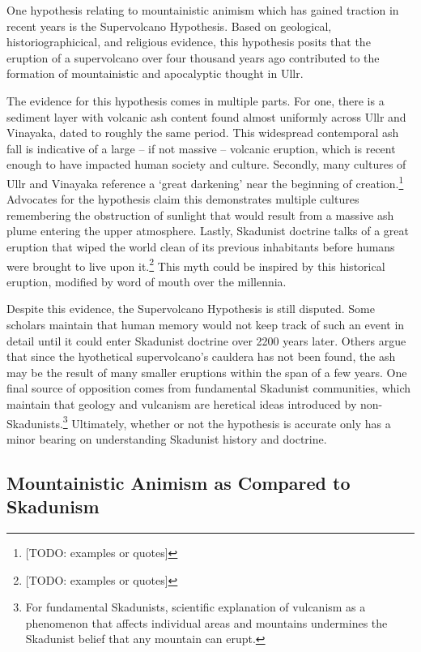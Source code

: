One hypothesis relating to mountainistic animism which has gained traction in recent years is the Supervolcano Hypothesis. Based on geological, historiographicical, and religious evidence, this hypothesis posits that the eruption of a supervolcano over four thousand years ago contributed to the formation of mountainistic and apocalyptic thought in Ullr. \par 

The evidence for this hypothesis comes in multiple parts. For one, there is a sediment layer with volcanic ash content found almost uniformly across Ullr and Vinayaka, dated to roughly the same period. This widespread contemporal ash fall is indicative of a large -- if not massive -- volcanic eruption, which is recent enough to have impacted human society and culture. Secondly, many cultures of Ullr and Vinayaka reference a `great darkening' near the beginning of creation.\footnote{[TODO: examples or quotes]} Advocates for the hypothesis claim this demonstrates multiple cultures remembering the obstruction of sunlight that would result from a massive ash plume entering the upper atmosphere. Lastly, Skadunist doctrine talks of a great eruption that wiped the world clean of its previous inhabitants before humans were brought to live upon it.\footnote{[TODO: examples or quotes]} This myth could be inspired by this historical eruption, modified by word of mouth over the millennia.\par 

Despite this evidence, the Supervolcano Hypothesis is still disputed. Some scholars maintain that human memory would not keep track of such an event in detail until it could enter Skadunist doctrine over 2200 years later. Others argue that since the hyothetical supervolcano's cauldera has not been found, the ash may be the result of many smaller eruptions within the span of a few years. One final source of opposition comes from fundamental Skadunist communities, which maintain that geology and vulcanism are heretical ideas introduced by non-Skadunists.\footnote{For fundamental Skadunists, scientific explanation of vulcanism as a phenomenon that affects individual areas and mountains undermines the Skadunist belief that any mountain can erupt.} Ultimately, whether or not the hypothesis is accurate only has a minor bearing on understanding Skadunist history and doctrine.

\subsection{Mountainistic Animism as Compared to Skadunism}

